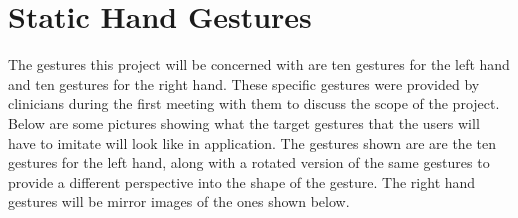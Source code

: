 \section{Static Hand Gestures}
The gestures this project will be concerned with are ten gestures for the left hand and ten gestures for the right hand. These specific gestures were provided by clinicians during the first meeting with them to discuss the scope of the project. Below are some pictures showing what the target gestures that the users will have to imitate will look like in application. The gestures shown are are the ten gestures for the left hand, along with a rotated version of the same gestures to provide a different perspective into the shape of the gesture. The right hand gestures will be mirror images of the ones shown below. 
